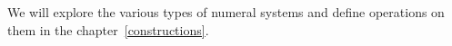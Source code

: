 \documentclass[\main/thesis.tex]{subfiles}
\begin{document}
We will explore the various types of numeral systems and define operations on
them in the chapter~\ref{constructions}.

%
%
%
\end{document}
